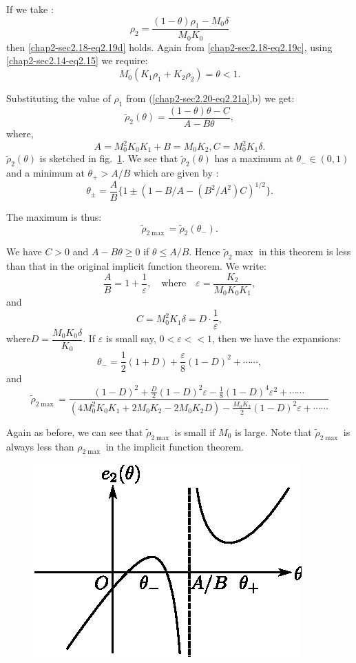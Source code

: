 If we take :
\begin{equation*}
\rho_2=  \frac{(1-\theta)\rho_1 - M_0 \delta}{M_0 K_0}
\tag{2.21a}\label{chap2-sec2.20-eq2.21a}  
\end{equation*} 
then \eqref{chap2-sec2.18-eq2.19d} holds. Again from
\eqref{chap2-sec2.18-eq2.19c}, using \eqref{chap2-sec2.14-eq2.15} we
require: 		
\begin{equation*}
M_0 (K_1\rho_1+ K_2\rho_2)= \theta <
1. \tag{2.21b}\label{chap2-sec2.20-eq2.21b} 
\end{equation*}

Substituting the value of $\rho_1$ from
(\ref{chap2-sec2.20-eq2.21a},b) we get:  
$$
\widetilde{\rho}_2(\theta)= \frac{(1-\theta)\theta - C}{A-B \theta},  
$$
where,
$$
A=M^2_0 K_0 K_1+B = M_0 K_2, C=M_0^2 K_1\delta.  
$$
\noindent
$\widetilde{\rho}_2(\theta)$ is sketched in
fig.~\ref{chap2-fig2.2}. We see that
$\widetilde{\rho}_2(\theta)$ has a maximum at $\theta_-\in (0,1)$ and a
minimum at $\theta_+> A/B$ which are given by : 
$$
\theta_\pm = \frac{A}{B}\{1 \pm (1-B/A- (B^2/A^2)C)^{1/2}\}.
$$

The maximum is thus: 
$$
\widetilde{\rho}_{2 \max }= \widetilde{\rho}_2(\theta_{-}).
$$

We have $C > 0$ and $A-B \theta \geq 0$ if $\theta \leq A/B$. Hence
$\widetilde{\rho}_2 \max$ in this theorem is less than that in the
original implicit function theorem. We write: 
$$
\frac{A}{B}= 1+\frac{1}{\varepsilon},\quad \text{where}\quad
\varepsilon =  \frac{K_2}{M_0 K_0 K_1},  
$$
and  
$$
C= M^2_0 K_1 \delta = D\cdot \frac{1}{\varepsilon},
$$
where\pageoriginale $D= \dfrac{M_0 K_0 \delta}{K_0}$. If $\varepsilon$
is small say, $0< \varepsilon << 1$, then we have the expansions: 
$$
\theta_- = \frac{1}{2} (1+D) +  \frac{\varepsilon}{8} (1-D)^2 + \cdots\cdots,  
$$
and 
$$
\widetilde{\rho}_{2\max} = \frac{(1-D)^2 + \frac{D}{2}(1-D)^2
  \varepsilon 
-   \frac{1}{8}(1-D)^4 \varepsilon^2 + \cdots\cdots}{(4M^2_0 K_0 K_1 +
  2M_0 K_2 - 2M_0 K_2 D ) - \frac{M_0 K_2}{2}(1-D)^2 \varepsilon + \cdots\cdots}  
 $$

Again as before, we can see that $\widetilde{\rho}_{2 \max}$ is small if
$M_0$ is large. Note that $\widetilde{\rho}_{2 \max}$ is always less than
$\rho_{2\max}$ in the implicit function theorem.  

\begin{figure}[H]
\centering
\includegraphics{vol79-fig/fig79-15.eps}
\smallskip
\caption{}
\label{chap2-fig2.2}
\end{figure}

